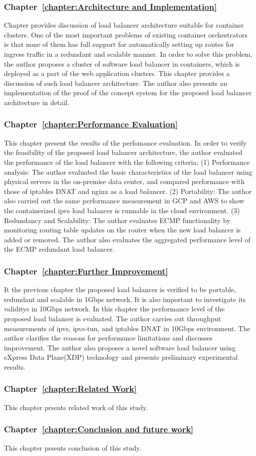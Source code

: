 \subsubsection{Chapter~\ref{chapter:Architecture and Implementation}}
Chapter  provides discussion of load balancer architecture suitable for container clusters.
One of the most important problems of existing container orchestrators is that none of them has full support for automatically setting up routes for ingress traffic in a redundant and scalable manner.
In order to solve this problem, the author proposes a cluster of software load balancer in containers, which is deployed as a part of the web application clusters.
This chapter provides a discussion of such load balancer architecture.
The author also presents an implementation of the proof of the concept system for the proposed load balancer architecture in detail.

\subsubsection{Chapter~\ref{chapter:Performance Evaluation}}
This chapter present the results of the perfomance evaluation.
In order to verify the feasibility of the proposed load balancer architecture, the author evaluated the performance of the load balancer with the following criteria;
(1) Performance analysis:
The author evaluated the basic characteristics of the load balancer using physical servers in the on-premise data center, and compared performance with those of iptables DNAT and nginx as a load balancer.
(2) Portability:
The author also carried out the same performance measurement in GCP and AWS to show the containerized ipvs load balancer is runnable in the cloud environment.
(3) Redundancy and Scalability:
The author evaluates ECMP functionality by monitoring routing table updates on the router when the new load balancer is added or removed.
The author also evaluates the aggregated performance level of the ECMP redundant load balancer.

\subsubsection{Chapter~\ref{chapter:Further Improvement}}
It the previous chapter the proposed load balancer is verified to be portable, redundant and scalable in 1Gbps network.
It is also important to investigate its validitys in 10Gbps network.
In this chapter the performance level of the proposed load balancer is evaluated.
The author carries out throughput measurements of ipvs, ipvs-tun, and iptables DNAT in 10Gbps environment.
The author clarifies the reasons for performance limitations and discusses improvement.
The author also proposes a novel software load balancer using eXpress Data Plane(XDP) technology and presents preliminary experimental results.

\subsubsection{Chapter~\ref{chapter:Related Work}}
This chapter prsents related work of this study.

\subsubsection{Chapter~\ref{chapter:Conclusion and future work}}
This chapter prsents conclusion of this study.



